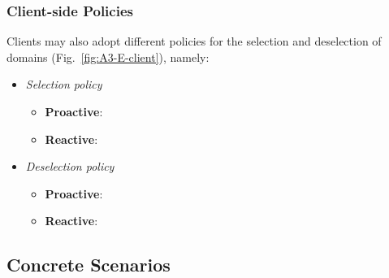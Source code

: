 \subsubsection*{Client-side Policies}

Clients may also adopt different policies for the selection and deselection of domains (Fig.~\ref{fig:A3-E-client}), namely:


\begin{itemize}
	
	\item \textit{Selection policy}
	
	\begin{itemize}
		
		\item \textbf{Proactive}: 
		
		\item \textbf{Reactive}: 
		
	\end{itemize}
	
	\item \textit{Deselection policy}
	
	\begin{itemize}
		
		\item \textbf{Proactive}: 
		
		\item \textbf{Reactive}: 
		
	\end{itemize}
\end{itemize}

\subsection{Concrete Scenarios}

